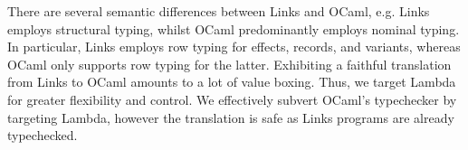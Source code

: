 \documentclass[preprint,numbers]{sigplanconf}
\newcommand{\msgbox}[2]{{%
  \par\noindent\small\color{red}%
  \framebox{\parbox{\dimexpr\linewidth-2\fboxsep-2\fboxrule}{\textbf{#1:} #2}}%
}}
\newcommand{\kc}[1]{\msgbox{KC}{#1}}
\begin{document}
%

There are several semantic differences between Links and OCaml, e.g. Links
employs structural typing, whilst OCaml predominantly employs nominal typing.
In particular, Links employs row typing for effects, records, and variants,
whereas OCaml only supports row typing for the latter. Exhibiting a faithful
translation from Links to OCaml amounts to a lot of value boxing. Thus, we
target Lambda for greater flexibility and control.  We effectively subvert
OCaml's typechecker by targeting Lambda, however the translation is safe as
Links programs are already typechecked.



\end{document}
